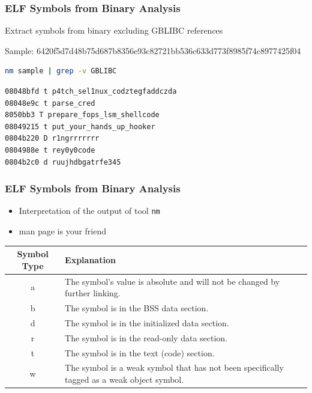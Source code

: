 \begin{frame}[fragile]
\frametitle{ELF Symbols from Binary Analysis}

Extract symbols from binary excluding GBLIBC references

Sample: 6420f5d7d48b75d687b8356e93c82721bb536c633d773f8985f74c8977425f04
\begin{lstlisting}[language=bash, basicstyle=\ttfamily, frame=single]
nm sample | grep -v GBLIBC
\end{lstlisting}


\begin{lstlisting}[basicstyle=\ttfamily, frame=single]
08048bfd t p4tch_sel1nux_codztegfaddczda
08048e9c t parse_cred
8050bb3 T prepare_fops_lsm_shellcode
08049215 t put_your_hands_up_hooker
0804b220 D r1ngrrrrrrr
0804988e t rey0y0code
0804b2c0 d ruujhdbgatrfe345
\end{lstlisting}
\end{frame}

\begin{frame}
\frametitle{ELF Symbols from Binary Analysis}

\begin{itemize}
    \item Interpretation of the output of tool \tt{nm}
    \item man page is your friend
\end{itemize}

\begin{tabular}{|c|p{}|}
\hline
\textbf{Symbol Type} & \textbf{Explanation} \\ \hline
a & The symbol's value is absolute and will not be changed by further linking. \\ \hline
b & The symbol is in the BSS data section. \\ \hline
d & The symbol is in the initialized data section. \\ \hline
r & The symbol is in the read-only data section. \\ \hline
t & The symbol is in the text (code) section. \\ \hline
w & The symbol is a weak symbol that has not been specifically tagged as a weak object symbol. \\ \hline
\end{tabular}

\end{frame}

